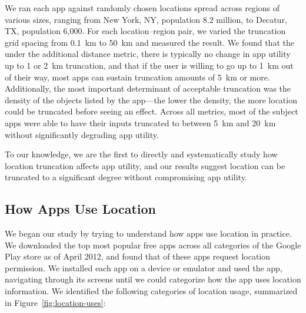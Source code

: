 We ran each app against \numpointspercity randomly chosen locations
spread across \numcities regions of various sizes, ranging from New
York, NY, population 8.2 million, to Decatur, TX, population
6,000. For each location--region pair, we varied the truncation grid
spacing from 0.1~km to 50~km and measured the result. We found that
the under the additional distance metric, there is typically no change
in app utility up to 1 or 2~km truncation, and that if the user is
willing to go up to 1~km out of their way, most apps can sustain
truncation amounts of 5~km or more. Additionally, the most important
determinant of acceptable truncation was the density of the objects
listed by the app---the lower the density, the more location could be
truncated before seeing an effect.  Across all metrics, most of the
subject apps were able to have their inputs truncated to between 5~km
and 20~km without significantly degrading app utility.

To our knowledge, we are the first to directly and systematically
study how location truncation affects app utility, and our results
suggest location can be truncated to a significant degree without
compromising app utility.

\subsection{How Apps Use Location}
\label{sec:usage}

We began our study by trying to understand how apps use location in
practice. We downloaded the top \numinvestigatedapps most popular free
apps across all categories of the Google Play store as of April 2012,
and found that \numappsusinglocation of these apps request location
permission.  We installed each app on a device or emulator and used
the app, navigating through its screens until we could categorize how
the app uses location information. We identified the following
categories of location usage, summarized in
Figure~\ref{fig:location-uses}:

